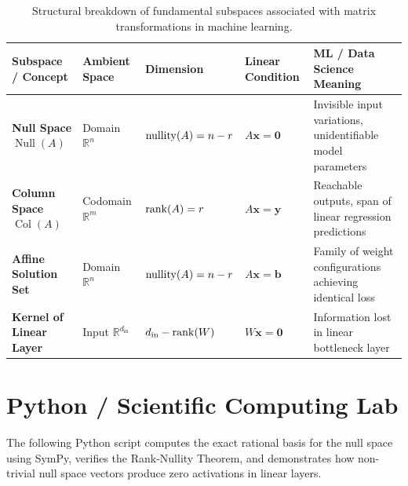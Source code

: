 \begin{table}[htbp]
\centering
\small
\begin{tabular}{p{3.2cm} p{2.2cm} p{2.5cm} p{2.5cm} p{3.2cm}}
\toprule
\textbf{Subspace / Concept} & \textbf{Ambient Space} & \textbf{Dimension} & \textbf{Linear Condition} & \textbf{ML / Data Science Meaning} \\
\midrule
\textbf{Null Space $\operatorname{Null}(A)$} & Domain $\mathbb{R}^n$ & $\operatorname{nullity}(A) = n - r$ & $A\mathbf{x} = \mathbf{0}$ & Invisible input variations, unidentifiable model parameters \\
\textbf{Column Space $\operatorname{Col}(A)$} & Codomain $\mathbb{R}^m$ & $\operatorname{rank}(A) = r$ & $A\mathbf{x} = \mathbf{y}$ & Reachable outputs, span of linear regression predictions \\
\textbf{Affine Solution Set} & Domain $\mathbb{R}^n$ & $\operatorname{nullity}(A) = n - r$ & $A\mathbf{x} = \mathbf{b}$ & Family of weight configurations achieving identical loss \\
\textbf{Kernel of Linear Layer} & Input $\mathbb{R}^{d_{\text{in}}}$ & $d_{\text{in}} - \operatorname{rank}(W)$ & $W\mathbf{x} = \mathbf{0}$ & Information lost in linear bottleneck layer \\
\bottomrule
\end{tabular}
\caption{Structural breakdown of fundamental subspaces associated with matrix transformations in machine learning.}
\label{tab:nullspace_linear_summary}
\end{table}

\section{Python / Scientific Computing Lab}

The following Python script computes the exact rational basis for the null space using SymPy, verifies the Rank-Nullity Theorem, and demonstrates how non-trivial null space vectors produce zero activations in linear layers.

